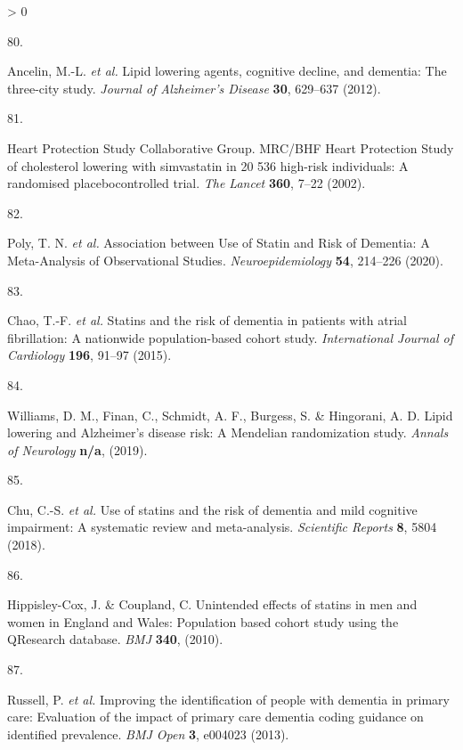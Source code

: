 \documentclass[a4paper, twoside]{templates/ociamthesis}
\newlength{\cslhangindent}
\newlength{\csllabelwidth}
\newenvironment{CSLReferences}[3] %
 {%
  \setlength{\parindent}{0pt}
  \ifodd #1 \everypar{\setlength{\hangindent}{\cslhangindent}}\ignorespaces\fi
  \ifnum #2 > 0
  \setlength{\parskip}{#2\baselineskip}
  \fi
 }%
 {}
\newcommand{\CSLLeftMargin}[1]{\parbox[t]{\maxof{\widthof{#1}}{\csllabelwidth}}{#1}}
\newcommand{\CSLRightInline}[1]{\parbox[t]{\linewidth - \csllabelwidth}{#1}}
\begin{document}
\begin{CSLReferences}{0}{0}
\leavevmode\hypertarget{ref-ancelin2012}{}%
\CSLLeftMargin{80. }
\CSLRightInline{Ancelin, M.-L. \emph{et al.} Lipid lowering agents, cognitive decline, and dementia: The three-city study. \emph{Journal of Alzheimer's Disease} \textbf{30}, 629--637 (2012).}

\leavevmode\hypertarget{ref-heartprotectionstudycollaborativegroup2002}{}%
\CSLLeftMargin{81. }
\CSLRightInline{Heart Protection Study Collaborative Group. {MRC}/{BHF Heart Protection Study} of cholesterol lowering with simvastatin in 20 536 high-risk individuals: A randomised placebocontrolled trial. \emph{The Lancet} \textbf{360}, 7--22 (2002).}

\leavevmode\hypertarget{ref-poly2020}{}%
\CSLLeftMargin{82. }
\CSLRightInline{Poly, T. N. \emph{et al.} Association between {Use} of {Statin} and {Risk} of {Dementia}: {A Meta}-{Analysis} of {Observational Studies}. \emph{Neuroepidemiology} \textbf{54}, 214--226 (2020).}

\leavevmode\hypertarget{ref-chao2015}{}%
\CSLLeftMargin{83. }
\CSLRightInline{Chao, T.-F. \emph{et al.} Statins and the risk of dementia in patients with atrial fibrillation: {A} nationwide population-based cohort study. \emph{International Journal of Cardiology} \textbf{196}, 91--97 (2015).}

\leavevmode\hypertarget{ref-williams}{}%
\CSLLeftMargin{84. }
\CSLRightInline{Williams, D. M., Finan, C., Schmidt, A. F., Burgess, S. \& Hingorani, A. D. Lipid lowering and {Alzheimer}'s disease risk: A {Mendelian} randomization study. \emph{Annals of Neurology} \textbf{n/a}, (2019).}

\leavevmode\hypertarget{ref-chu2018}{}%
\CSLLeftMargin{85. }
\CSLRightInline{Chu, C.-S. \emph{et al.} Use of statins and the risk of dementia and mild cognitive impairment: {A} systematic review and meta-analysis. \emph{Scientific Reports} \textbf{8}, 5804 (2018).}

\leavevmode\hypertarget{ref-hippisley-cox2010}{}%
\CSLLeftMargin{86. }
\CSLRightInline{Hippisley-Cox, J. \& Coupland, C. Unintended effects of statins in men and women in {England} and {Wales}: Population based cohort study using the {QResearch} database. \emph{BMJ} \textbf{340}, (2010).}

\leavevmode\hypertarget{ref-russell2013}{}%
\CSLLeftMargin{87. }
\CSLRightInline{Russell, P. \emph{et al.} Improving the identification of people with dementia in primary care: Evaluation of the impact of primary care dementia coding guidance on identified prevalence. \emph{BMJ Open} \textbf{3}, e004023 (2013).}


\end{CSLReferences}
\end{document}
